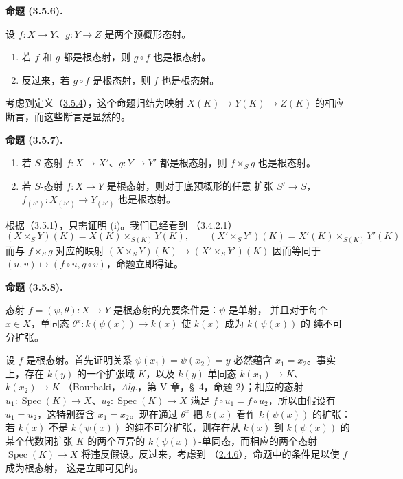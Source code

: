 \documentclass[UTF8,fontset=none,11pt,oneside,openany]{ctexbook}
\newenvironment{proposition}[1][]{%
  \par\medskip\noindent\textbf{命题 (#1).}\ %
}{\par}
\let\EGAOriginalLabel\label
\renewcommand{\label}[1]{\phantomsection\EGAOriginalLabel{#1}}
\begin{document}
\begin{proposition}[3.5.6]
\label{I.3.5.6-fr}
设 $f:X\to Y$、$g:Y\to Z$ 是两个预概形态射。
\begin{enumerate}
  \item[(i)] 若 $f$ 和 $g$ 都是根态射，则 $g\circ f$ 也是根态射。
  \item[(ii)] 反过来，若 $g\circ f$ 是根态射，则 $f$ 也是根态射。
\end{enumerate}
\end{proposition}

考虑到定义（\hyperref[I.3.5.4-fr]{3.5.4}），这个命题归结为映射
$X(K)\to Y(K)\to Z(K)$ 的相应断言，而这些断言是显然的。

\begin{proposition}[3.5.7]
\label{I.3.5.7-fr}
\begin{enumerate}
  \item[(i)] 若 $S$-态射 $f:X\to X'$、$g:Y\to Y'$ 都是根态射，则
  $f\times_S g$ 也是根态射。
  \item[(ii)] 若 $S$-态射 $f:X\to Y$ 是根态射，则对于底预概形的任意
  扩张 $S'\to S$，$f_{(S')}:X_{(S')}\to Y_{(S')}$ 也是根态射。
\end{enumerate}
\end{proposition}

根据（\hyperref[I.3.5.1-fr]{3.5.1}），只需证明 (i)。我们已经看到
（\hyperref[I.3.4.2.1-fr]{3.4.2.1}）
\label{I.3.5.7.field-valued-product-fr}
\[
  (X\times_S Y)(K)=X(K)\times_{S(K)}Y(K),\qquad
  (X'\times_S Y')(K)=X'(K)\times_{S(K)}Y'(K)
\]
而与 $f\times_S g$ 对应的映射
$(X\times_S Y)(K)\to(X'\times_S Y')(K)$ 因而等同于
$(u,v)\mapsto(f\circ u,g\circ v)$，命题立即得证。

\begin{proposition}[3.5.8]
\label{I.3.5.8-fr}
态射 $f=(\psi,\theta):X\to Y$ 是根态射的充要条件是：$\psi$ 是单射，
并且对于每个 $x\in X$，单同态
$\theta^x:k(\psi(x))\to k(x)$ 使 $k(x)$ 成为 $k(\psi(x))$ 的
纯不可分扩张。
\end{proposition}

设 $f$ 是根态射。首先证明关系 $\psi(x_1)=\psi(x_2)=y$ 必然蕴含
$x_1=x_2$。事实上，存在 $k(y)$ 的一个扩张域 $K$，以及
$k(y)$-单同态 $k(x_1)\to K$、$k(x_2)\to K$
（Bourbaki，\emph{Alg.}，第 V 章，\S~4，命题 2）；相应的态射
$u_1:\operatorname{Spec}(K)\to X$、$u_2:\operatorname{Spec}(K)\to X$
满足 $f\circ u_1=f\circ u_2$，所以由假设有 $u_1=u_2$，这特别蕴含
$x_1=x_2$。现在通过 $\theta^x$ 把 $k(x)$ 看作 $k(\psi(x))$ 的扩张：
若 $k(x)$ 不是 $k(\psi(x))$ 的纯不可分扩张，则存在从 $k(x)$ 到
$k(\psi(x))$ 的某个代数闭扩张 $K$ 的两个互异的
$k(\psi(x))$-单同态，而相应的两个态射
$\operatorname{Spec}(K)\to X$ 将违反假设。反过来，考虑到
（\hyperref[I.2.4.6-fr]{2.4.6}），命题中的条件足以使 $f$ 成为根态射，
这是立即可见的。
\end{document}
